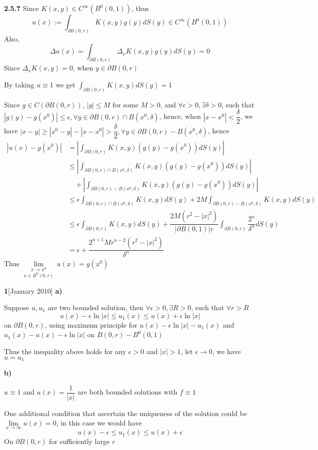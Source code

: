 \documentclass[../main.tex]{subfiles}
\begin{document}
\begin{customproblem}\textbf{2.5.7}
Since $K(x,y)\in C^{\infty}(B^{0}(0,1))$, thus $$u(x):=\int_{\partial B(0,r)}K(x,y)g(y)dS(y)\in C^{\infty}(B^{0}(0,1)) $$
Also, $$\Delta u(x) = \int_{\partial B(0,r)}\Delta_{x}K(x,y)g(y)dS(y) = 0 $$Since $\Delta_{x}K(x,y)=0$, when $y\in \partial B(0,r)$ \par
By taking $u\equiv 1$ we get $\displaystyle{\int_{\partial B(0,r)}K(x,y)dS(y)=1}$ \par
Since $g\in C(\partial B(0,r))$, $|g|\leq M$ for some $M>0$, and $\forall \epsilon > 0, \exists \delta > 0$, such that $\left|g(y)-g(x^{0})\right|\leq\epsilon, \forall y\in \partial B(0,r)\cap B(x^{0},\delta)$, hence, when $|x-x^{0}|<\dfrac{\delta}{2}$, we have $|x-y|\geq|x^{0}-y|-|x-x^{0}|>\dfrac{\delta}{2}, \forall y\in\partial B(0,r)- B(x^{0},\delta) $, hence
\[
\begin{aligned}
\left|u(x)-g(x^{0})\right|
&=\left|\int_{\partial B(0,r)}K(x,y)\left(g(y)-g(x^{0})\right)dS(y)\right| \\
&\leq \left|\int_{\partial B(0,r)\cap B(x^{0},\delta)}K(x,y)\left(g(y)-g(x^{0})\right)dS(y)\right| \\
&\quad + \left|\int_{\partial B(0,r)- B(x^{0},\delta)}K(x,y)\left(g(y)-g(x^{0})\right)dS(y)\right| \\
&\leq \epsilon\int_{\partial B(0,r)\cap B(x^{0},\delta)}K(x,y)dS(y) + 2M\int_{\partial B(0,r)- B(x^{0},\delta)}K(x,y)dS(y) \\
&\leq \epsilon\int_{\partial B(0,r)}K(x,y)dS(y) + \dfrac{2M\left(r^{2}-|x|^{2}\right)}{|\partial B(0,1)|r}\int_{\partial B(0,r)}\dfrac{2^{n}}{\delta^{n}} dS(y)  \\
&= \epsilon + \dfrac{2^{n+1}Mr^{n-2}\left(r^{2}-|x|^{2}\right)}{\delta^{n}}
\end{aligned}
\]Thus $\displaystyle{\underset{x\in B^{0}(0,r)}{\underset{x\rightarrow x^{0}}{\lim}}\,u(x)=g(x^{0})}$
\end{customproblem}

\begin{customproblem}\textbf{1}[January 2010]
\textbf{a)} \par
Suppose $u,u_{1}$ are two bounded solution, then $\forall \epsilon>0, \exists R>0$, such that $\forall r > R$
$$u(x)-\epsilon\ln|x| \leq u_{1}(x) \leq u(x)+\epsilon\ln|x|$$
on $\partial B(0,r)$, using maximum principle for $u(x)-\epsilon\ln|x|-u_{1}(x)$ and $u_{1}(x)-u(x)-\epsilon\ln|x|$ on $B(0,r)-B^{0}(0,1)$ \par
Thus the inequality above holds for any $\epsilon>0$ and $|x|>1$, let $\epsilon\rightarrow 0$, we have $u=u_{1}$ \par
\textbf{b)} \par
$u\equiv 1$ and $u(x)=\dfrac{1}{|x|}$ are both bounded solutions with $f\equiv 1$ \par
One additional condition that ascertain the uniqueness of the solution could be $\underset{x\rightarrow \infty}{\lim} u(x) = 0$, in this case we would have $$u(x)-\epsilon \leq u_{1}(x) \leq u(x)+\epsilon$$ On $\partial B(0,r)$ for sufficiently large $r$
\end{customproblem}
\end{document}
